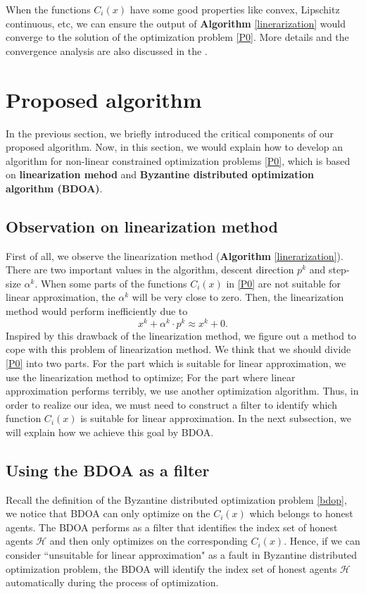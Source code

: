 \documentclass[conference]{IEEEtran}
\begin{document}
When the functions $C_i(x)$ have some good properties like convex, Lipschitz continuous, etc, we can ensure the output of \textbf{Algorithm} \ref{linerarization} would converge to the solution of the optimization problem \eqref{P0}. More details and the convergence analysis are also discussed in the \cite{wilson2012linearization}.

\section{Proposed algorithm}
In the previous section, we briefly introduced the critical components of our proposed algorithm. Now, in this section, we would explain how to develop an algorithm for non-linear constrained optimization problems \eqref{P0}, which is based on \textbf{linearization mehod} and \textbf{Byzantine distributed optimization algorithm (BDOA)}.

\subsection{Observation on linearization method}
First of all, we observe the linearization method (\textbf{Algorithm} \ref{linerarization}). There are two important values in the algorithm, descent direction $p^k$ and step-size $\alpha^k$. When some parts of the functions $C_i(x)$ in \eqref{P0} are not suitable for linear approximation, the $\alpha^k$ will be very close to zero. Then, the linearization method would perform inefficiently due to
\begin{equation*}
    x^k + \alpha^k \cdot p^k \approx x^k + 0.
\end{equation*}
Inspired by this drawback of the linearization method, we figure out a method to cope with this problem of linearization method. We think that we should divide \eqref{P0} into two parts. For the part which is suitable for linear approximation, we use the linearization method to optimize; For the part where linear approximation performs terribly, we use another optimization algorithm. Thus, in order to realize our idea, we must need to construct a filter to identify which function $C_i(x)$ is suitable for linear approximation. In the next subsection, we will explain how we achieve this goal by BDOA.

\subsection{Using the BDOA as a filter}
Recall the definition of the Byzantine distributed optimization problem \eqref{bdop}, we notice that BDOA can only optimize on the $C_i(x)$ which belongs to honest agents. The BDOA performs as a filter that identifies the index set of honest agents $\mathcal{H}$ and then only optimizes on the corresponding $C_i(x)$. Hence, if we can consider ``unsuitable for linear approximation" as a fault in Byzantine distributed optimization problem, the BDOA will identify the index set of honest agents $\mathcal{H}$ automatically during the process of optimization.
\end{document}

